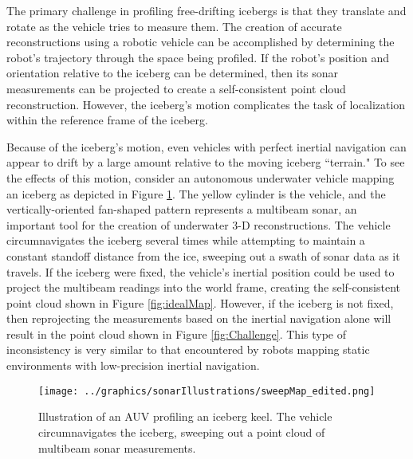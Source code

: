 The primary challenge in profiling free-drifting icebergs is that they translate and rotate as the vehicle tries to measure them. The creation of accurate reconstructions using a robotic vehicle can be accomplished by determining the robot's trajectory through the space being profiled. If the robot's position and orientation relative to the iceberg can be determined, then its sonar measurements can be projected to create a self-consistent point cloud reconstruction. However, the iceberg's motion complicates the task of localization within the reference frame of the iceberg.



Because of the iceberg's motion, even vehicles with perfect inertial navigation can appear to drift by a large amount relative to the moving iceberg ``terrain." To see the effects of this motion, consider an autonomous underwater vehicle mapping an iceberg as depicted in Figure \ref{fig:introSetup}. The yellow cylinder is the vehicle, and the vertically-oriented fan-shaped pattern represents a multibeam sonar, an important tool for the creation of underwater 3-D reconstructions. The vehicle circumnavigates the iceberg several times while attempting to maintain a constant standoff distance from the ice, sweeping out a swath of sonar data as it travels. If the iceberg were fixed, the vehicle's inertial position could be used to project the multibeam readings into the world frame, creating the self-consistent point cloud shown in Figure \ref{fig:idealMap}. However, if the iceberg is not fixed, then reprojecting the measurements based on the inertial navigation alone will result in the point cloud shown in Figure \ref{fig:Challenge}. This type of inconsistency is very similar to that encountered by robots mapping static environments with low-precision inertial navigation. 

\begin{figure}[!htb]
   \centering
   \texttt{[image: ../graphics/sonarIllustrations/sweepMap\_edited.png]} %
   \caption{Illustration of an AUV profiling an iceberg keel. The vehicle circumnavigates the iceberg, sweeping out a point cloud of multibeam sonar measurements. }
   \label{fig:introSetup}
\end{figure}

